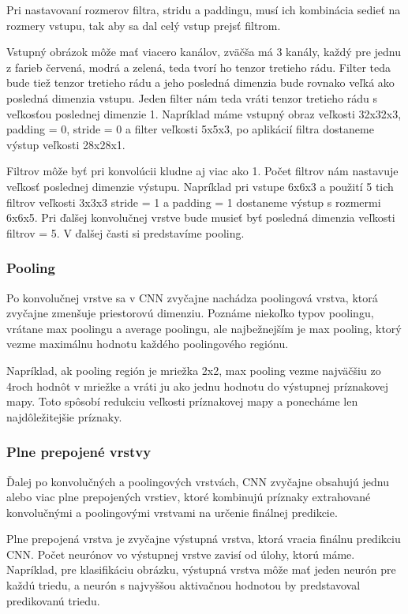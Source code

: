 Pri nastavovaní rozmerov filtra, stridu a paddingu, musí ich kombinácia sedieť na rozmery vstupu, tak aby sa dal celý vstup prejsť filtrom.

Vstupný obrázok môže mať viacero kanálov, zväčša má 3 kanály, každý pre jednu z farieb červená, modrá a zelená, teda tvorí ho tenzor tretieho rádu. Filter teda bude tiež tenzor tretieho rádu a jeho posledná dimenzia bude rovnako veľká ako posledná dimenzia vstupu. Jeden filter nám teda vráti tenzor tretieho rádu s veľkosťou poslednej dimenzie 1. Napríklad máme vstupný obraz veľkosti 32x32x3, padding = 0, stride = 0 a filter veľkosti 5x5x3, po aplikácií filtra dostaneme výstup veľkosti 28x28x1. 

Filtrov môže byť pri konvolúcii kludne aj viac ako 1. Počet filtrov nám nastavuje veľkosť poslednej dimenzie výstupu. Napríklad pri vstupe 6x6x3 a použití 5 tich filtrov veľkosti 3x3x3 stride = 1 a padding = 1 dostaneme výstup s rozmermi 6x6x5. Pri ďalšej konvolučnej vrstve bude musieť byť posledná dimenzia veľkosti filtrov = 5. V ďalšej časti si predstavíme pooling. 


\subsubsection{Pooling}
\hspace{\parindent} Po konvolučnej vrstve sa v CNN zvyčajne nachádza poolingová vrstva, ktorá zvyčajne zmenšuje priestorovú dimenziu. Poznáme niekoľko typov poolingu, vrátane max poolingu a average poolingu, ale najbežnejším je max pooling, ktorý vezme maximálnu hodnotu každého poolingového regiónu. 

Napríklad, ak pooling región je mriežka 2x2, max pooling vezme najväčšiu zo 4roch hodnôt v mriežke a vráti ju ako jednu hodnotu do výstupnej príznakovej mapy. Toto spôsobí redukciu veľkosti príznakovej mapy a ponecháme len najdôležitejšie príznaky. 

\subsubsection{Plne prepojené vrstvy}
\hspace{\parindent} Ďalej po konvolučných a poolingových vrstvách, CNN zvyčajne obsahujú jednu alebo viac plne prepojených vrstiev, ktoré kombinujú príznaky extrahované konvolučnými a poolingovými vrstvami na určenie finálnej predikcie. 

Plne prepojená vrstva je zvyčajne výstupná vrstva, ktorá vracia finálnu predikciu CNN. Počet neurónov vo výstupnej vrstve zavisí od úlohy, ktorú máme. Napríklad, pre klasifikáciu obrázku, výstupná vrstva môže mať jeden neurón pre každú triedu, a neurón s najvyššou aktivačnou hodnotou by predstavoval predikovanú triedu. 

